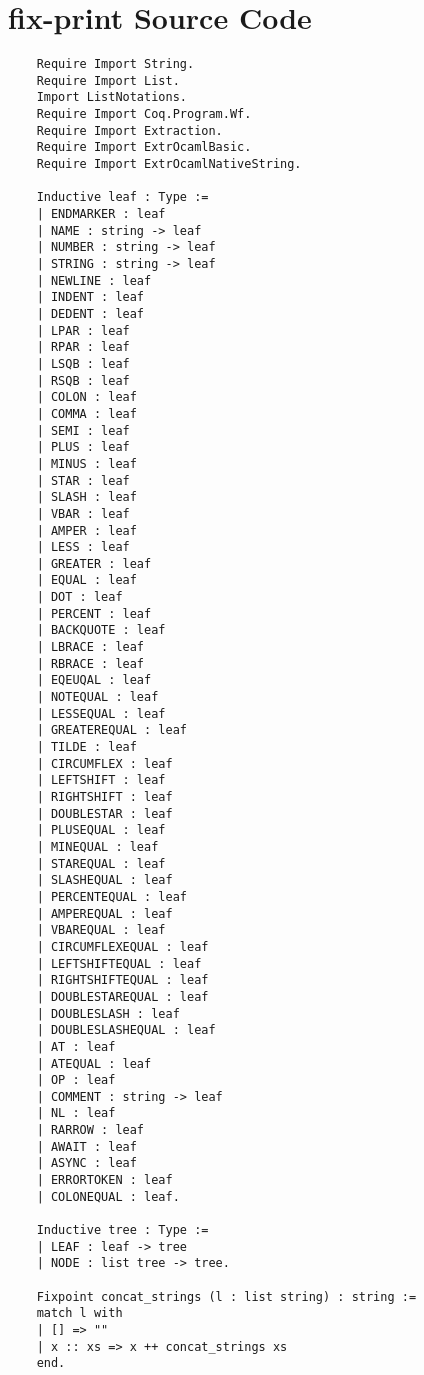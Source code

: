 \section{fix-print Source Code}
\label{appendix:Source-Code}

\begin{verbatim}
    Require Import String.
    Require Import List.
    Import ListNotations.
    Require Import Coq.Program.Wf.
    Require Import Extraction.
    Require Import ExtrOcamlBasic.
    Require Import ExtrOcamlNativeString.

    Inductive leaf : Type :=
    | ENDMARKER : leaf
    | NAME : string -> leaf
    | NUMBER : string -> leaf
    | STRING : string -> leaf
    | NEWLINE : leaf
    | INDENT : leaf
    | DEDENT : leaf
    | LPAR : leaf
    | RPAR : leaf
    | LSQB : leaf
    | RSQB : leaf
    | COLON : leaf
    | COMMA : leaf
    | SEMI : leaf
    | PLUS : leaf
    | MINUS : leaf
    | STAR : leaf
    | SLASH : leaf
    | VBAR : leaf
    | AMPER : leaf
    | LESS : leaf
    | GREATER : leaf
    | EQUAL : leaf
    | DOT : leaf
    | PERCENT : leaf
    | BACKQUOTE : leaf
    | LBRACE : leaf
    | RBRACE : leaf
    | EQEUQAL : leaf
    | NOTEQUAL : leaf
    | LESSEQUAL : leaf
    | GREATEREQUAL : leaf
    | TILDE : leaf
    | CIRCUMFLEX : leaf
    | LEFTSHIFT : leaf
    | RIGHTSHIFT : leaf
    | DOUBLESTAR : leaf
    | PLUSEQUAL : leaf
    | MINEQUAL : leaf
    | STAREQUAL : leaf
    | SLASHEQUAL : leaf
    | PERCENTEQUAL : leaf
    | AMPEREQUAL : leaf
    | VBAREQUAL : leaf
    | CIRCUMFLEXEQUAL : leaf
    | LEFTSHIFTEQUAL : leaf
    | RIGHTSHIFTEQUAL : leaf
    | DOUBLESTAREQUAL : leaf
    | DOUBLESLASH : leaf
    | DOUBLESLASHEQUAL : leaf
    | AT : leaf
    | ATEQUAL : leaf
    | OP : leaf
    | COMMENT : string -> leaf
    | NL : leaf
    | RARROW : leaf
    | AWAIT : leaf
    | ASYNC : leaf
    | ERRORTOKEN : leaf
    | COLONEQUAL : leaf.

    Inductive tree : Type :=
    | LEAF : leaf -> tree
    | NODE : list tree -> tree.

    Fixpoint concat_strings (l : list string) : string :=
    match l with
    | [] => "" 
    | x :: xs => x ++ concat_strings xs
    end.


\end{verbatim}
